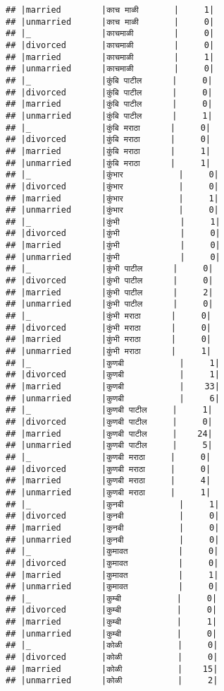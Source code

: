 \documentclass[
]{article}
\begin{document}
\begin{verbatim}
## |married        |काच माळी       |     1|
## |unmarried      |काच माळी       |     0|
## |_              |काचमाळी        |     0|
## |divorced       |काचमाळी        |     0|
## |married        |काचमाळी        |     1|
## |unmarried      |काचमाळी        |     0|
## |_              |कुंबि पाटील      |     0|
## |divorced       |कुंबि पाटील      |     0|
## |married        |कुंबि पाटील      |     0|
## |unmarried      |कुंबि पाटील      |     1|
## |_              |कुंबि मराठा      |     0|
## |divorced       |कुंबि मराठा      |     0|
## |married        |कुंबि मराठा      |     1|
## |unmarried      |कुंबि मराठा      |     1|
## |_              |कुंभार           |     0|
## |divorced       |कुंभार           |     0|
## |married        |कुंभार           |     1|
## |unmarried      |कुंभार           |     0|
## |_              |कुंभी            |     1|
## |divorced       |कुंभी            |     0|
## |married        |कुंभी            |     0|
## |unmarried      |कुंभी            |     0|
## |_              |कुंभी पाटील      |     0|
## |divorced       |कुंभी पाटील      |     0|
## |married        |कुंभी पाटील      |     2|
## |unmarried      |कुंभी पाटील      |     0|
## |_              |कुंभी मराठा      |     0|
## |divorced       |कुंभी मराठा      |     0|
## |married        |कुंभी मराठा      |     0|
## |unmarried      |कुंभी मराठा      |     1|
## |_              |कुणबी           |     1|
## |divorced       |कुणबी           |     1|
## |married        |कुणबी           |    33|
## |unmarried      |कुणबी           |     6|
## |_              |कुणबी पाटील     |     1|
## |divorced       |कुणबी पाटील     |     0|
## |married        |कुणबी पाटील     |    24|
## |unmarried      |कुणबी पाटील     |     5|
## |_              |कुणबी मराठा     |     0|
## |divorced       |कुणबी मराठा     |     0|
## |married        |कुणबी मराठा     |     4|
## |unmarried      |कुणबी मराठा     |     1|
## |_              |कुनबी           |     1|
## |divorced       |कुनबी           |     0|
## |married        |कुनबी           |     0|
## |unmarried      |कुनबी           |     0|
## |_              |कुमावत          |     0|
## |divorced       |कुमावत          |     0|
## |married        |कुमावत          |     1|
## |unmarried      |कुमावत          |     0|
## |_              |कुम्बी           |     0|
## |divorced       |कुम्बी           |     0|
## |married        |कुम्बी           |     1|
## |unmarried      |कुम्बी           |     0|
## |_              |कोळी           |     0|
## |divorced       |कोळी           |     0|
## |married        |कोळी           |    15|
## |unmarried      |कोळी           |     2|

\end{verbatim}
\end{document}
